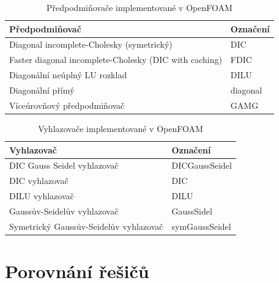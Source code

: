 \documentclass[a4paper,12pt]{report}
\theoremstyle{remark}
\begin{document}
\begin{table}[H]
	\centering
	\caption{Předpodmiňovače implementované v OpenFOAM}
	\renewcommand{\arraystretch}{1.7}
	\begin{tabular}{*2l}
		\toprule
		\textbf{Předpodmiňovač} & \textbf{Označení}\\
		\midrule
		{\small Diagonal incomplete-Cholesky (symetrický)}& DIC\\
		{\small Faster diagonal incomplete-Cholesky (DIC with caching)	}& FDIC \\		
		{\small Diagonální neúplný LU rozklad}& DILU  \\
		{\small Diagonální přímý}& diagonal \\
		{\small Víceúrovňový předpodmiňovač}& GAMG  \\
		\bottomrule
	\end{tabular}
	
	\label{table:preconditioners}
\end{table}

\begin{table}[H]
	\centering
	\caption{Vyhlazovače implementované v OpenFOAM}
	\renewcommand{\arraystretch}{1.7}
	\begin{tabular}{*2l}
		\toprule
		\textbf{Vyhlazovač} & \textbf{Označení}\\
		\midrule
		{\small DIC Gauss Seidel vyhlazovač}& DICGaussSeidel\\
		{\small DIC vyhlazovač}& DIC\\		
		{\small DILU vyhlazovač}& DILU \\		
		{\small Gaussův-Seidelův vyhlazovač}& GaussSidel  \\
		{\small Symetrický Gaussův-Seidelův vyhlazovač}& symGaussSeidel \\
		\bottomrule
	\end{tabular}
	\label{table:smoothers}
\end{table}

	{\let\clearpage\relax \chapter{Porovnání řešičů}}
	
\end{document}
